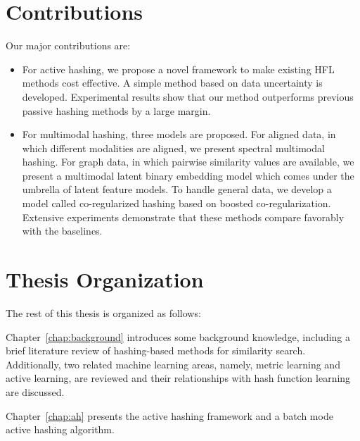 \section{Contributions}

Our major contributions are:
\begin{itemize}
\item For active hashing, we propose a novel framework to make existing \mbox{HFL} methods cost effective. A simple method based on data uncertainty is developed. Experimental results show that our method outperforms previous passive hashing methods by a large margin.

\item For multimodal hashing, three models are proposed. For aligned data, in which different modalities are aligned, we present spectral multimodal hashing. For graph data, in which pairwise similarity values are available, we present a multimodal latent binary embedding model which comes under the umbrella of latent feature models. To handle general data, we develop a model called co-regularized hashing based on boosted co-regularization. Extensive experiments demonstrate that these methods compare favorably with the baselines.
\end{itemize}


\section{Thesis Organization}

The rest of this thesis is organized as follows:

Chapter~\ref{chap:background} introduces some background knowledge, including a brief literature review of hashing-based methods for similarity search. Additionally, two related machine learning areas, namely, metric learning and active learning, are reviewed and their relationships with hash function learning are discussed.

Chapter~\ref{chap:ah} presents the active hashing framework and a batch mode active hashing algorithm.

